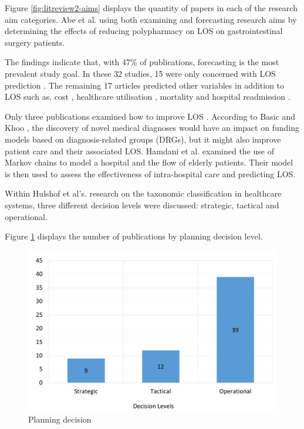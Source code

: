\documentclass[../thesis.tex]{subfiles}
\begin{document}
Figure \ref{fig:litreview2-aims} displays the quantity of papers in each of the research aim categories. Abe et al. \cite{Abe} using both examining and forecasting research aims by determining the effects of reducing polypharmacy on LOS on gastrointestinal surgery patients. 

    The findings indicate that, with 47\% of publications, forecasting is the most prevalent study goal. In these 32 studies, 15 were only concerned with LOS prediction \cite{Abe,Alyahya2017,Beauchet2018,Cacciatore2012,Hoben2019,Launay2018,Lisk2018,Marano2022,Marshall1,Nishino2019,Pustavoitau2016,Sommerfeld2011,Supervia2008,Takahashi2011,Willems2012}. The remaining 17 articles predicted other variables in addition to LOS such as, cost \cite{Feuerstadt2022,Tropea2016}, healthcare utilisation \cite{Fan2021}, mortality \cite{Bahrmann2018,Feuerstadt2022, Volpato2014} and hospital readmission \cite{Bahrmann2018, Morandi2013, Rajamaki2020}.

Only three publications examined how to improve LOS \cite{Basic2015,Hamdani,Walsh2020}. According to Basic and Khoo \cite{Basic2015}, the discovery of novel medical diagnoses would have an impact on funding models based on diagnosis-related groups (DRGs), but it might also improve patient care and their associated LOS. Hamdani et al. \cite{Hamdani} examined the use of Markov chains to model a hospital and the flow of elderly patients. Their model is then used to assess the effectiveness of intra-hospital care and predicting LOS.

Within Hulshof et al's. \cite{PHulshof} research on the taxonomic classification in healthcare systems, three different decision levels were discussed: strategic, tactical and operational.

Figure \ref{fig:lr2decisions} displays the number of publications by planning decision level. 

\begin{figure}[h!]
    \centering
    \includegraphics[scale=0.55]{Chapters/Chapter2/Figures2/decision1.pdf}
    \caption{Planning decision}
    \label{fig:lr2decisions}
\end{figure}
\end{document}
